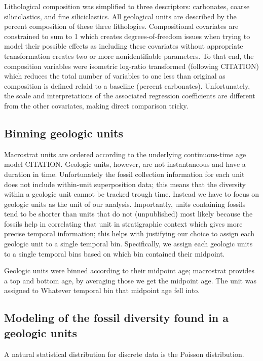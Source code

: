 \documentclass[12pt,letterpaper]{article}
\begin{document}
Lithological composition was simplified to three descriptors: carbonates, coarse siliciclastics, and fine siliciclastics. All geological units are described by the percent composition of these three lithologies. Compositional covariates are constrained to sum to 1 which creates degrees-of-freedom issues when trying to model their possible effects as including these covariates without appropriate transformation creates two or more nonidentifiable parameters. To that end, the composition variables were isometric log-ratio transformed (following CITATION) which reduces the total number of variables to one less than original as composition is defined relaid to a baseline (percent carbonates). Unfortunately, the scale and interpretations of the associated regression coefficients are different from the other covariates, making direct comparison tricky.


\subsection{Binning geologic units}

Macrostrat units are ordered according to the underlying continuous-time age model CITATION. Geologic units, however, are not instantaneous and have a duration in time. Unfortunately the fossil collection information for each unit does not include within-unit superposition data; this means that the diversity within a geologic unit cannot be tracked trough time. Instead we have to focus on geologic units as the unit of our analysis. Importantly, units containing fossils tend to be shorter than units that do not (unpublished) most likely because the fossils help in correlating that unit in stratigraphic context which gives more precise temporal information; this helps with justifying our choice to assign each geologic unit to a single temporal bin. Specifically, we assign each geologic units to a single temporal bins based on which bin contained their midpoint. 

Geologic units were binned according to their midpoint age; macrostrat provides a top and bottom age, by averaging those we get the midpoint age. The unit was assigned to Whatever temporal bin that midpoint age fell into.


\subsection{Modeling of the fossil diversity found in a geologic units}

A natural statistical distribution for discrete data is the Poisson distribution. 
\end{document}
